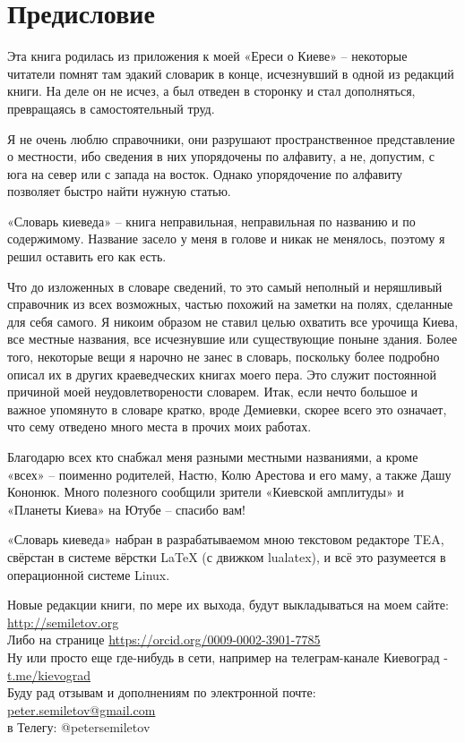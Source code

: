 \chapter*{Предисловие}

Эта книга родилась из приложения к моей «Ереси о Киеве» – некоторые читатели помнят там эдакий словарик в конце, исчезнувший в одной из редакций книги. На деле он не исчез, а был отведен в сторонку и стал дополняться, превращаясь в самостоятельный труд.

Я не очень люблю справочники, они разрушают пространственное представление о местности, ибо сведения в них упорядочены по алфавиту, а не, допустим, с юга на север или с запада на восток. Однако упорядочение по алфавиту позволяет быстро найти нужную статью.

«Словарь киеведа» – книга неправильная, неправильная по названию и по содержимому. Название засело у меня в голове и никак не менялось, поэтому я решил оставить его как есть. 

Что до изложенных в словаре сведений, то это самый неполный и неряшливый справочник из всех возможных, частью похожий на заметки на полях, сделанные для себя самого. Я никоим образом не ставил целью охватить все урочища Киева, все местные названия, все исчезнувшие или существующие поныне здания. Более того, некоторые вещи я нарочно не занес в словарь, поскольку более подробно описал их в других краеведческих книгах моего пера. Это служит постоянной причиной моей неудовлетворености словарем. Итак, если нечто большое и важное упомянуто в словаре кратко, вроде Демиевки, скорее всего это означает, что сему отведено много места в прочих моих работах.

Благодарю всех кто снабжал меня разными местными названиями, а кроме «всех» – поименно родителей, Настю, Колю Арестова и его маму, а также Дашу Кононюк. Много полезного сообщили зрители «Киевской амплитуды» и «Планеты Киева» на Ютубе – спасибо вам!

«Словарь киеведа» набран в разрабатываемом мною текстовом редакторе TEA, свёрстан в системе вёрстки LaTeX (с движком lualatex), и всё это разумеется в операционной системе Linux.

Новые редакции книги, по мере их выхода, будут выкладываться на моем сайте:\\ 
\href{http://semiletov.org}{http://semiletov.org}\\
Либо на странице \href{https://orcid.org/0009-0002-3901-7785}{https://orcid.org/0009-0002-3901-7785}\\
Ну или просто еще где-нибудь в сети, например на телеграм-канале Киевоград - \href{t.me/kievograd}{t.me/kievograd}\\

Буду рад отзывам и дополнениям по электронной почте: \href{mailto:peter.semiletov@gmail.com}{peter.semiletov@gmail.com}\\
в Телегу: @petersemiletov
